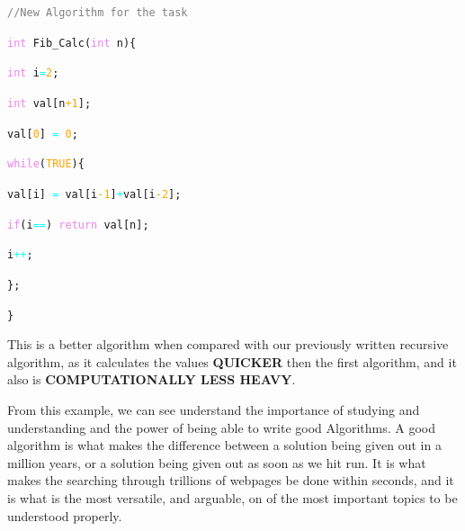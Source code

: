 \documentclass{article}
\theoremstyle{definition}
\theoremstyle{example}
\begin{document}
\vspace{5mm}
\noindent \hspace{30mm} \texttt{\textcolor{gray}{//New Algorithm for the task}}\par
\noindent \hspace{30mm} \texttt{\textcolor{violet}{int} Fib\_Calc(\textcolor{violet}{int} n)\{}\par
\noindent \hspace{40mm} \texttt{\textcolor{violet}{int} i\textcolor{cyan}{=}\textcolor{orange}{2};}\par
\noindent \hspace{40mm} \texttt{\textcolor{violet}{int} val[n\textcolor{orange}{+1}];}\par
\noindent \hspace{40mm} \texttt{val[\textcolor{orange}{0}] \textcolor{cyan}{=} \textcolor{orange}{0};}\par
\noindent \hspace{40mm} \texttt{\textcolor{violet}{while}(\textcolor{orange}{TRUE})\{}\par
\noindent \hspace{50mm} \texttt{val[i] \textcolor{cyan}{=} val[i\textcolor{orange}{-1}]\textcolor{cyan}{+}val[i\textcolor{orange}{-2}];}\par
\noindent \hspace{50mm} \texttt{\textcolor{violet}{if}(i\textcolor{cyan}{==}) \textcolor{violet}{return} val[n];}\par
\noindent \hspace{50mm} \texttt{i\textcolor{cyan}{++};}\par
\noindent \hspace{40mm} \texttt{\};}\par
\noindent \hspace{30mm} \texttt{\}}\par

This is a better algorithm when compared with our previously written recursive algorithm, as it calculates the values \textbf{QUICKER} then the first algorithm, and it also is \textbf{COMPUTATIONALLY LESS HEAVY}.\par
\vspace{5mm}
From this example, we can see understand the importance of studying and understanding and the power of being able to write good Algorithms. A good algorithm is what makes the difference between a solution being given out in a million years, or a solution being given out as soon as we hit run. It is what makes the searching through trillions of webpages be done within seconds, and it is what is the most versatile, and arguable, on of the most important topics to be understood properly.
\end{document}
